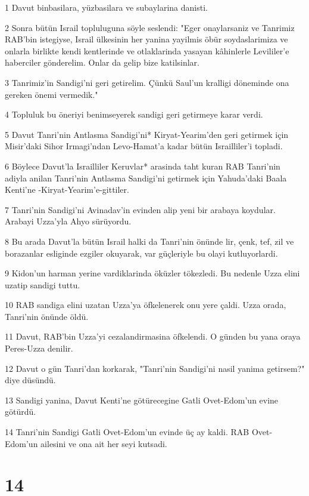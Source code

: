 \par 1 Davut binbasilara, yüzbasilara ve subaylarina danisti.
\par 2 Sonra bütün Israil topluluguna söyle seslendi: "Eger onaylarsaniz ve Tanrimiz RAB'bin istegiyse, Israil ülkesinin her yanina yayilmis öbür soydaslarimiza ve onlarla birlikte kendi kentlerinde ve otlaklarinda yasayan kâhinlerle Levililer'e haberciler gönderelim. Onlar da gelip bize katilsinlar.
\par 3 Tanrimiz'in Sandigi'ni geri getirelim. Çünkü Saul'un kralligi döneminde ona gereken önemi vermedik."
\par 4 Topluluk bu öneriyi benimseyerek sandigi geri getirmeye karar verdi.
\par 5 Davut Tanri'nin Antlasma Sandigi'ni* Kiryat-Yearim'den geri getirmek için Misir'daki Sihor Irmagi'ndan Levo-Hamat'a kadar bütün Israilliler'i topladi.
\par 6 Böylece Davut'la Israilliler Keruvlar* arasinda taht kuran RAB Tanri'nin adiyla anilan Tanri'nin Antlasma Sandigi'ni getirmek için Yahuda'daki Baala Kenti'ne -Kiryat-Yearim'e-gittiler.
\par 7 Tanri'nin Sandigi'ni Avinadav'in evinden alip yeni bir arabaya koydular. Arabayi Uzza'yla Ahyo sürüyordu.
\par 8 Bu arada Davut'la bütün Israil halki da Tanri'nin önünde lir, çenk, tef, zil ve borazanlar esliginde ezgiler okuyarak, var güçleriyle bu olayi kutluyorlardi.
\par 9 Kidon'un harman yerine vardiklarinda öküzler tökezledi. Bu nedenle Uzza elini uzatip sandigi tuttu.
\par 10 RAB sandiga elini uzatan Uzza'ya öfkelenerek onu yere çaldi. Uzza orada, Tanri'nin önünde öldü.
\par 11 Davut, RAB'bin Uzza'yi cezalandirmasina öfkelendi. O günden bu yana oraya Peres-Uzza denilir.
\par 12 Davut o gün Tanri'dan korkarak, "Tanri'nin Sandigi'ni nasil yanima getirsem?" diye düsündü.
\par 13 Sandigi yanina, Davut Kenti'ne götürecegine Gatli Ovet-Edom'un evine götürdü.
\par 14 Tanri'nin Sandigi Gatli Ovet-Edom'un evinde üç ay kaldi. RAB Ovet-Edom'un ailesini ve ona ait her seyi kutsadi.

\chapter{14}

